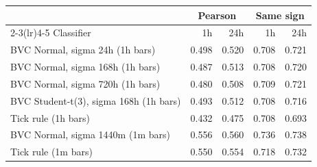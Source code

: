 \begin{tabular}{lrrrr}
\toprule
 & \multicolumn{2}{c}{Pearson} & \multicolumn{2}{c}{Same sign}\\
\cmidrule(lr){2-3}\cmidrule(lr){4-5} Classifier & 1h & 24h & 1h & 24h\\
\midrule
BVC Normal, sigma 24h (1h bars) & 0.498 & 0.520 & 0.708 & 0.721\\
BVC Normal, sigma 168h (1h bars) & 0.487 & 0.513 & 0.708 & 0.720\\
BVC Normal, sigma 720h (1h bars) & 0.480 & 0.508 & 0.709 & 0.721\\
BVC Student-t(3), sigma 168h (1h bars) & 0.493 & 0.512 & 0.708 & 0.716\\
Tick rule (1h bars) & 0.432 & 0.475 & 0.708 & 0.693\\
BVC Normal, sigma 1440m (1m bars) & 0.556 & 0.560 & 0.736 & 0.738\\
Tick rule (1m bars) & 0.550 & 0.554 & 0.718 & 0.732\\
\bottomrule
\end{tabular}
